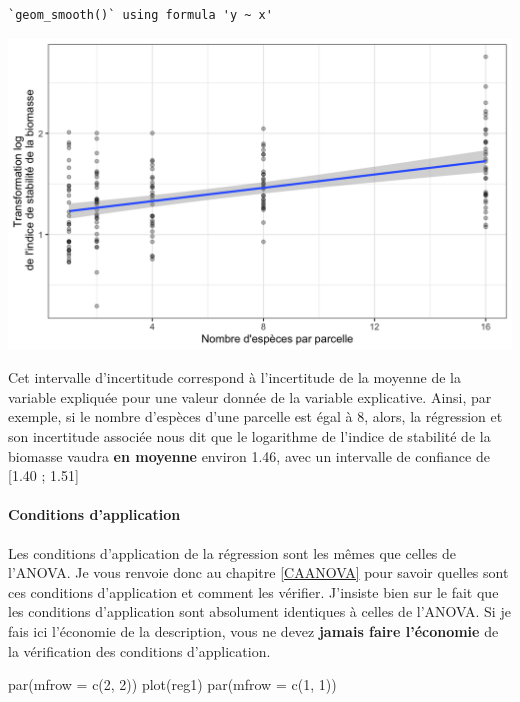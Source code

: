 \documentclass[
  a4paper,
]{article}
\newenvironment{Shaded}{\begin{snugshade}}{\end{snugshade}}
\newcommand{\AttributeTok}[1]{\textcolor[rgb]{0.00,0.34,0.68}{#1}}
\newcommand{\DecValTok}[1]{\textcolor[rgb]{0.69,0.50,0.00}{#1}}
\newcommand{\FunctionTok}[1]{\textcolor[rgb]{0.39,0.29,0.61}{#1}}
\newcommand{\NormalTok}[1]{\textcolor[rgb]{0.12,0.11,0.11}{#1}}
\begin{document}
\begin{verbatim}
`geom_smooth()` using formula 'y ~ x'
\end{verbatim}

\begin{center}\includegraphics[width=0.9\linewidth]{figure/unnamed-chunk-122-1} \end{center}

Cet intervalle d'incertitude correspond à l'incertitude de la moyenne de la variable expliquée pour une valeur donnée de la variable explicative. Ainsi, par exemple, si le nombre d'espèces d'une parcelle est égal à 8, alors, la régression et son incertitude associée nous dit que le logarithme de l'indice de stabilité de la biomasse vaudra \textbf{en moyenne} environ 1.46, avec un intervalle de confiance de {[}1.40 ; 1.51{]}

\hypertarget{conditions-dapplication-4}{%
\paragraph{Conditions d'application}\label{conditions-dapplication-4}}

Les conditions d'application de la régression sont les mêmes que celles de l'ANOVA. Je vous renvoie donc au chapitre \ref{CAANOVA} pour savoir quelles sont ces conditions d'application et comment les vérifier. J'insiste bien sur le fait que les conditions d'application sont absolument identiques à celles de l'ANOVA. Si je fais ici l'économie de la description, vous ne devez \textbf{jamais faire l'économie} de la vérification des conditions d'application.

\begin{Shaded}
\begin{Highlighting}[]
\FunctionTok{par}\NormalTok{(}\AttributeTok{mfrow =} \FunctionTok{c}\NormalTok{(}\DecValTok{2}\NormalTok{, }\DecValTok{2}\NormalTok{))}
\FunctionTok{plot}\NormalTok{(reg1)}
\FunctionTok{par}\NormalTok{(}\AttributeTok{mfrow =} \FunctionTok{c}\NormalTok{(}\DecValTok{1}\NormalTok{, }\DecValTok{1}\NormalTok{))}
\end{Highlighting}
\end{Shaded}
\end{document}
